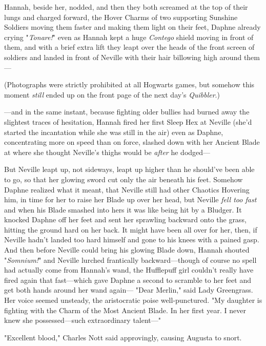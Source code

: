 Hannah, beside her, nodded, and then they both screamed at the top of their 
lungs and charged forward, the Hover Charms of two supporting Sunshine Soldiers 
moving them faster and making them light on their feet, Daphne already crying 
"\emph{Tonare!}" even as Hannah kept a huge \emph{Contego} shield moving in 
front of them, and with a brief extra lift they leapt over the heads of the 
front screen of soldiers and landed in front of Neville with their hair 
billowing high around them---

(Photographs were strictly prohibited at all Hogwarts games, but somehow this 
moment \emph{still} ended up on the front page of the next day's 
\emph{Quibbler}.)

---and in the same instant, because fighting older bullies had burned away the 
slightest traces of hesitation, Hannah fired her first Sleep Hex at Neville 
(she'd started the incantation while she was still in the air) even as Daphne, 
concentrating more on speed than on force, slashed down with her Ancient Blade 
at where she thought Neville's thighs would be \emph{after} he dodged---

But Neville leapt up, not sideways, leapt up higher than he should've been able 
to go, so that her glowing sword cut only the air beneath his feet. Somehow 
Daphne realized what it meant, that Neville still had other Chaotics Hovering 
him, in time for her to raise her Blade up over her head, but Neville 
\emph{fell too fast} and when his Blade smashed into hers it was like being hit 
by a Bludger. It knocked Daphne off her feet and sent her sprawling backward 
onto the grass, hitting the ground hard on her back. It might have been all 
over for her, then, if Neville hadn't landed too hard himself and gone to his 
knees with a pained gasp. And then before Neville could bring his glowing Blade 
down, Hannah shouted "\emph{Somnium!}" and Neville lurched frantically 
backward---though of course no spell had actually come from Hannah's wand, the 
Hufflepuff girl couldn't really have fired again that fast---which gave Daphne 
a second to scramble to her feet and get both hands around her wand again---
\sbreak
"Dear Merlin," said Lady Greengrass. Her voice seemed unsteady, the 
aristocratic poise well-punctured. "My daughter is fighting with the Charm of 
the Most Ancient Blade. In her first year. I never knew she possessed---such 
extraordinary talent---"

"Excellent blood," Charles Nott said approvingly, causing Augusta to snort.

